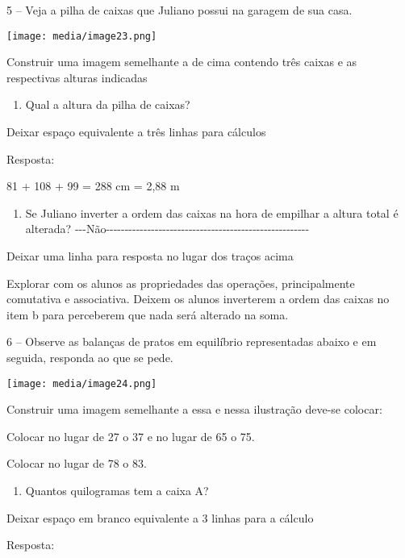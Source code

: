 5 -- Veja a pilha de caixas que Juliano possui na garagem de sua casa.

\texttt{[image: media/image23.png]}

Construir uma imagem semelhante a de cima contendo três caixas e as
respectivas alturas indicadas

\begin{enumerate}
\def\labelenumi{\alph{enumi})}
\item
  Qual a altura da pilha de caixas?
\end{enumerate}

Deixar espaço equivalente a três linhas para cálculos

Resposta:

81 + 108 + 99 = 288 cm = 2,88 m

\begin{enumerate}
\def\labelenumi{\alph{enumi})}
\item
  Se Juliano inverter a ordem das caixas na hora de empilhar a altura
  total é alterada?
  -\/-\/-Não-\/-\/-\/-\/-\/-\/-\/-\/-\/-\/-\/-\/-\/-\/-\/-\/-\/-\/-\/-\/-\/-\/-\/-\/-\/-\/-\/-\/-\/-\/-\/-\/-\/-\/-\/-\/-\/-\/-\/-\/-\/-\/-\/-\/-\/-\/-\/-\/-\/-\/-\/-\/-\/-
\end{enumerate}

Deixar uma linha para resposta no lugar dos traços acima

Explorar com os alunos as propriedades das operações, principalmente
comutativa e associativa. Deixem os alunos inverterem a ordem das caixas
no item b para perceberem que nada será alterado na soma.

6 -- Observe as balanças de pratos em equilíbrio representadas abaixo e
em seguida, responda ao que se pede.

\texttt{[image: media/image24.png]}

Construir uma imagem semelhante a essa e nessa ilustração deve-se
colocar:

Colocar no lugar de 27 o 37 e no lugar de 65 o 75.

Colocar no lugar de 78 o 83.

\begin{enumerate}
\def\labelenumi{\alph{enumi})}
\item
  Quantos quilogramas tem a caixa A?
\end{enumerate}

Deixar espaço em branco equivalente a 3 linhas para a cálculo

Resposta:

